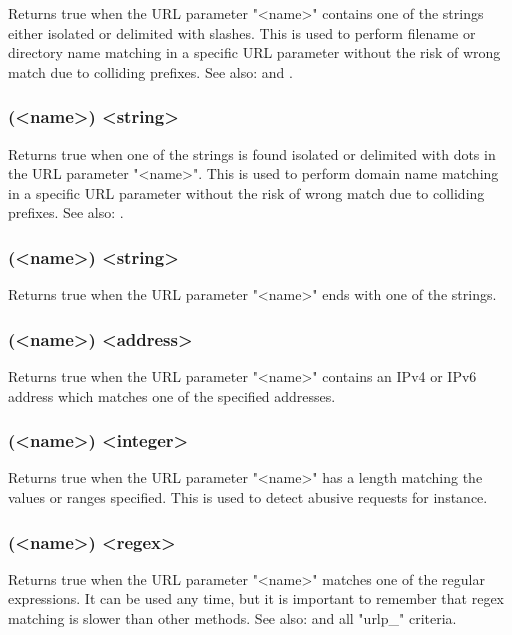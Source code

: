   Returns true when the URL parameter "<name>" contains one of the strings
  either isolated or delimited with slashes. This is used to perform filename
  or directory name matching in a specific URL parameter without the risk of
  wrong match due to colliding prefixes.
See also:  and .

\subsubsection[urlp\_dom]{(<name>) <string>}

  Returns true when one of the strings is found isolated or delimited with dots
  in the URL parameter "<name>". This is used to perform domain name matching
  in a specific URL parameter without the risk of wrong match due to colliding
  prefixes.
See also: .

\subsubsection[urlp\_end]{(<name>) <string>}

  Returns true when the URL parameter "<name>" ends with one of the strings.

\subsubsection[urlp\_ip]{(<name>) <address>}

  Returns true when the URL parameter "<name>" contains an IPv4 or IPv6 address
  which matches one of the specified addresses.

\subsubsection[urlp\_len]{(<name>) <integer>}

  Returns true when the URL parameter "<name>" has a length matching the values
  or ranges specified. This is used to detect abusive requests for instance.

\subsubsection[urlp\_reg]{(<name>) <regex>}

  Returns true when the URL parameter "<name>" matches one of the regular
  expressions. It can be used any time, but it is important to remember that
  regex matching is slower than other methods.
See also:  and all
  "urlp\_" criteria.


